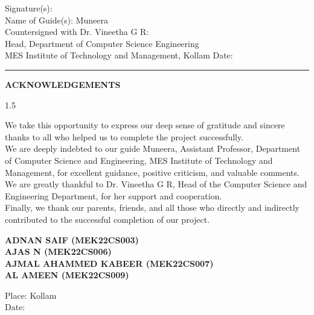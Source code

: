 \noindent Signature(s): \\[0.2cm]
\noindent Name of Guide(s): Muneera\\[0.2cm]

\noindent Countersigned with Dr. Vineetha G R:\\[0.1cm]
\noindent Head, Department of Computer Science Engineering\\[0.2cm]
\noindent MES Institute of Technology and Management, Kollam \hfill Date: \rule{2cm}{0.4pt}

\vfill

\newpage
\thispagestyle{plain}
\setcounter{page}{1}
\begin{center}
{\fontsize{14}{16}\selectfont \textbf{ACKNOWLEDGEMENTS}}
\end{center}
\vspace{0.2cm}

\begin{spacing}{1.5}
\fontsize{12}{14}\selectfont

We take this opportunity to express our deep sense of gratitude and sincere thanks to all who helped us to complete the project successfully.\\

\noindent We are deeply indebted to our guide Muneera, Assistant Professor, Department of Computer Science and Engineering, MES Institute of Technology and Management, for excellent guidance, positive criticism, and valuable comments. We are greatly thankful to Dr. Vineetha G R, Head of the Computer Science and Engineering Department, for her support and cooperation.\\

\noindent Finally, we thank our parents, friends, and all those who directly and indirectly contributed to the successful completion of our project.

\end{spacing}

\vspace{1cm}

\begin{flushright}
\textbf{ADNAN SAIF (MEK22CS003)}\\
\textbf{AJAS N (MEK22CS006)}\\
\textbf{AJMAL AHAMMED KABEER (MEK22CS007)} \\
\textbf{AL AMEEN (MEK22CS009)}\\
\end{flushright}

\vspace{0.5cm}
\noindent Place: Kollam\\[0.3cm]
\noindent Date:

